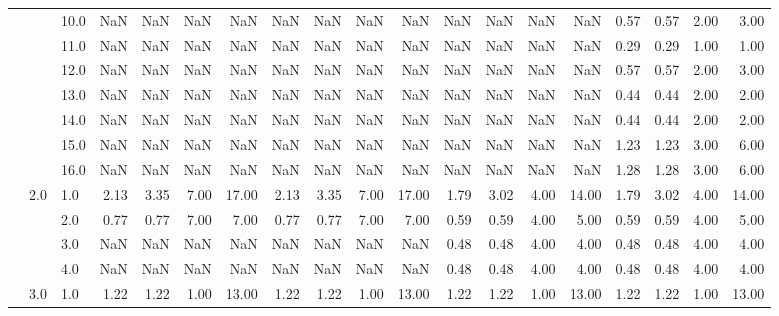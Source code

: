 \begin{tabular}{lllrrrrrrrrrrrrrrrr}
     &     & 10.0 &        NaN &       NaN &   NaN &    NaN &        NaN &       NaN &  NaN &    NaN &        NaN &       NaN &  NaN &    NaN &       0.57 &      0.57 & 2.00 &   3.00 \\
     &     & 11.0 &        NaN &       NaN &   NaN &    NaN &        NaN &       NaN &  NaN &    NaN &        NaN &       NaN &  NaN &    NaN &       0.29 &      0.29 & 1.00 &   1.00 \\
     &     & 12.0 &        NaN &       NaN &   NaN &    NaN &        NaN &       NaN &  NaN &    NaN &        NaN &       NaN &  NaN &    NaN &       0.57 &      0.57 & 2.00 &   3.00 \\
     &     & 13.0 &        NaN &       NaN &   NaN &    NaN &        NaN &       NaN &  NaN &    NaN &        NaN &       NaN &  NaN &    NaN &       0.44 &      0.44 & 2.00 &   2.00 \\
     &     & 14.0 &        NaN &       NaN &   NaN &    NaN &        NaN &       NaN &  NaN &    NaN &        NaN &       NaN &  NaN &    NaN &       0.44 &      0.44 & 2.00 &   2.00 \\
     &     & 15.0 &        NaN &       NaN &   NaN &    NaN &        NaN &       NaN &  NaN &    NaN &        NaN &       NaN &  NaN &    NaN &       1.23 &      1.23 & 3.00 &   6.00 \\
     &     & 16.0 &        NaN &       NaN &   NaN &    NaN &        NaN &       NaN &  NaN &    NaN &        NaN &       NaN &  NaN &    NaN &       1.28 &      1.28 & 3.00 &   6.00 \\
     & 2.0 & 1.0  &       2.13 &      3.35 &  7.00 &  17.00 &       2.13 &      3.35 & 7.00 &  17.00 &       1.79 &      3.02 & 4.00 &  14.00 &       1.79 &      3.02 & 4.00 &  14.00 \\
     &     & 2.0  &       0.77 &      0.77 &  7.00 &   7.00 &       0.77 &      0.77 & 7.00 &   7.00 &       0.59 &      0.59 & 4.00 &   5.00 &       0.59 &      0.59 & 4.00 &   5.00 \\
     &     & 3.0  &        NaN &       NaN &   NaN &    NaN &        NaN &       NaN &  NaN &    NaN &       0.48 &      0.48 & 4.00 &   4.00 &       0.48 &      0.48 & 4.00 &   4.00 \\
     &     & 4.0  &        NaN &       NaN &   NaN &    NaN &        NaN &       NaN &  NaN &    NaN &       0.48 &      0.48 & 4.00 &   4.00 &       0.48 &      0.48 & 4.00 &   4.00 \\
     & 3.0 & 1.0  &       1.22 &      1.22 &  1.00 &  13.00 &       1.22 &      1.22 & 1.00 &  13.00 &       1.22 &      1.22 & 1.00 &  13.00 &       1.22 &      1.22 & 1.00 &  13.00 \\

\end{tabular}
